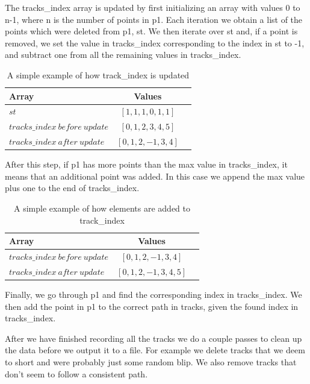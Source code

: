 \documentclass[conference]{IEEEtran}
\begin{document}
The tracks\_index array is updated by first initializing an array with values 0 to n-1, where n is the number of points in p1. Each iteration we obtain a list of the points which were deleted from p1, st. We then iterate over st and, if a point is removed, we set the value in tracks\_index corresponding to the index in st to -1, and subtract one from all the remaining values in tracks\_index.

\begin{table}[!t]
\caption{A simple example of how track\_index is updated}
\label{table_index}
\centering
\begin{tabular}{ | l | c | r | }
 \hline
 Array & Values\\
  \hline\hline                    
  $st$ & $[1, 1, 1, 0, 1, 1]$\\
  \hline
  $tracks\_index\ before\ update$ & $[0, 1, 2, 3, 4, 5]$ \\
  \hline
  $tracks\_index\ after\ update$ & $[0, 1, 2, -1, 3, 4]$ \\
  \hline  
\end{tabular}
\end{table}

After this step, if p1 has more points than the max value in tracks\_index, it means that an additional point was added. In this case we append the max value plus one to the end of tracks\_index.

\begin{table}[!t]
\caption{A simple example of how elements are added to track\_index}
\label{table_index_add}
\centering
\begin{tabular}{ | l | c | r | }
 \hline
 Array & Values\\
  \hline\hline                     
  $tracks\_index\ before\ update$ & $[0, 1, 2, -1, 3, 4]$ \\
  \hline
  $tracks\_index\ after\ update$ & $[0, 1, 2, -1, 3, 4, 5]$ \\
  \hline  
\end{tabular}
\end{table}

Finally, we go through p1 and find the corresponding index in tracks\_index. We then add the point in p1 to the correct path in tracks, given the found index in tracks\_index.

After we have finished recording all the tracks we do a couple passes to clean up the data before we output it to a file. For example we delete tracks that we deem to short and were probably just some random blip. We also remove tracks that don’t seem to follow a consistent path.
\end{document}
